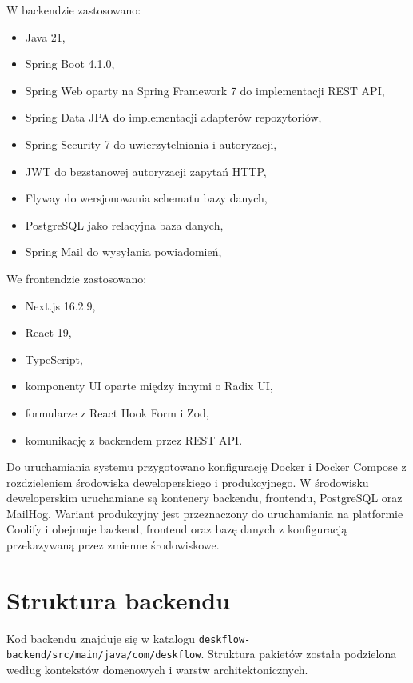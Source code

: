 W backendzie zastosowano:
\begin{itemize}
    \item Java 21,
    \item Spring Boot 4.1.0,
    \item Spring Web oparty na Spring Framework 7 do implementacji REST API,
    \item Spring Data JPA do implementacji adapterów repozytoriów,
    \item Spring Security 7 do uwierzytelniania i autoryzacji,
    \item JWT do bezstanowej autoryzacji zapytań HTTP,
    \item Flyway do wersjonowania schematu bazy danych,
    \item PostgreSQL jako relacyjna baza danych,
    \item Spring Mail do wysyłania powiadomień,
\end{itemize}

We frontendzie zastosowano:
\begin{itemize}
    \item Next.js 16.2.9,
    \item React 19,
    \item TypeScript,
    \item komponenty UI oparte między innymi o Radix UI,
    \item formularze z React Hook Form i Zod,
    \item komunikację z backendem przez REST API.
\end{itemize}

Do uruchamiania systemu przygotowano konfigurację Docker i Docker Compose z rozdzieleniem środowiska deweloperskiego i produkcyjnego. W środowisku deweloperskim uruchamiane są kontenery backendu, frontendu, PostgreSQL oraz MailHog. Wariant produkcyjny jest przeznaczony do uruchamiania na platformie Coolify i obejmuje backend, frontend oraz bazę danych z konfiguracją przekazywaną przez zmienne środowiskowe.

\section{Struktura backendu}

Kod backendu znajduje się w katalogu \texttt{deskflow-backend/src/main/java/com/deskflow}. Struktura pakietów została podzielona według kontekstów domenowych i warstw architektonicznych.


